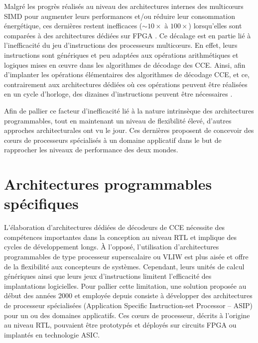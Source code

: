 \documentclass[../main.tex]{subfiles}
\begin{document}
Malgré les progrès réalisés au niveau des architectures internes des multicœurs SIMD pour augmenter leurs performances et/ou réduire leur consommation énergétique, ces dernières restent inefficaces ($\sim 10 \times$ à $100 \times$) lorsqu’elles sont comparées à des architectures dédiées sur FPGA \cite{FAIR:LDPC}. Ce décalage est en partie lié à l’inefficacité du jeu d’instructions des processeurs multicœurs. En effet, leurs instructions sont génériques et peu adaptées aux opérations arithmétiques et logiques mises en œuvre dans les algorithmes de décodage des CCE. Ainsi, afin d’implanter les opérations élémentaires des algorithmes de décodage CCE, et ce, contrairement aux architectures dédiées où ces opérations peuvent être réalisées en un cycle d’horloge, des dizaines d’instructions peuvent être nécessaires \cite{BLG:REVUE:TPDS}.


Afin de pallier ce facteur d’inefficacité lié à la nature intrinsèque des architectures programmables, tout en maintenant un niveau de flexibilité élevé, d’autres approches architecturales ont vu le jour. Ces dernières proposent de concevoir des cœurs de processeurs spécialisés à un domaine applicatif dans le but de rapprocher les niveaux de performance des deux mondes.
% 
% 
% 
% 
% 
\section{Architectures programmables spécifiques}
% 
% 
% 
% 
% 
L'élaboration d’architectures dédiées de décodeurs de CCE nécessite des compétences importantes dans la conception au niveau RTL et implique des cycles de développement longs. À l’opposé, l’utilisation d’architectures programmables de type processeur superscalaire ou VLIW est plus aisée et offre de la flexibilité aux concepteurs de systèmes. Cependant, leurs unités de calcul génériques ainsi que leurs jeux d’instructions limitent l’efficacité des implantations logicielles. Pour pallier cette limitation, une solution proposée au début des années 2000 \cite{XXX} et employée depuis consiste à développer des architectures de processeur spécialisées (Application Specific Instruction-set Processor – ASIP) pour un ou des domaines applicatifs. Ces cœurs de processeur, décrits à l’origine au niveau RTL, pouvaient être prototypés et déployés sur circuits FPGA ou implantés en technologie ASIC.
\end{document}
